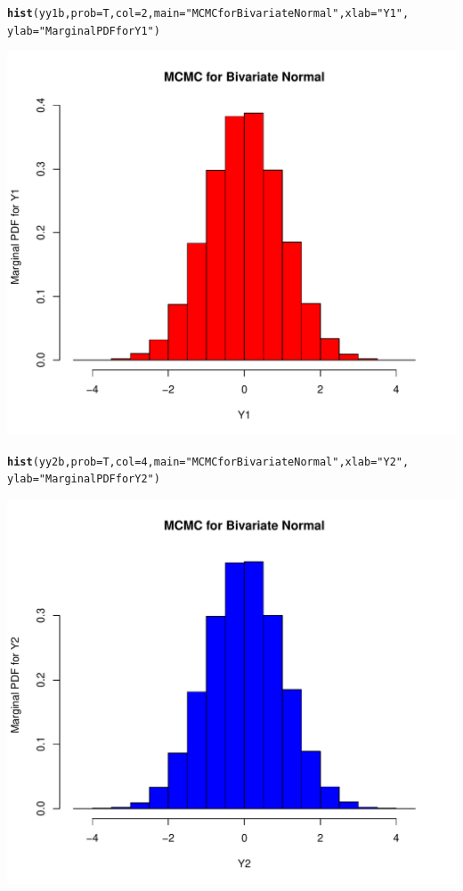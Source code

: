\documentclass[12pt, a4paper, oneside]{article}\usepackage[]{graphicx}\usepackage[]{color}
\makeatletter
\def\maxwidth{ %
  \ifdim\Gin@nat@width>\linewidth
    \linewidth
  \else
    \Gin@nat@width
  \fi
}
\newcommand{\hlstr}[1]{\textcolor[rgb]{0.192,0.494,0.8}{#1}}%
\newcommand{\hlkwd}[1]{\textcolor[rgb]{0.737,0.353,0.396}{\textbf{#1}}}%
\newenvironment{kframe}{%
 \def\at@end@of@kframe{}%
 \ifinner\ifhmode%
  \def\at@end@of@kframe{\end{minipage}}%
  \begin{minipage}{\columnwidth}%
 \fi\fi%
 \def\FrameCommand##1{\hskip\@totalleftmargin \hskip-\fboxsep
 \colorbox{shadecolor}{##1}\hskip-\fboxsep
     \hskip-\linewidth \hskip-\@totalleftmargin \hskip\columnwidth}%
 \MakeFramed {\advance\hsize-\width
   \@totalleftmargin\z@ \linewidth\hsize
   \@setminipage}}%
 {\par\unskip\endMakeFramed%
 \at@end@of@kframe}
\newenvironment{knitrout}{}{} %
\makeatother
\begin{document}
\begin{knitrout}
\color{fgcolor}\begin{kframe}
\begin{alltt}
\hlkwd{hist}(yy1b, prob = T, col = 2, main = \hlstr{"MCMC for Bivariate Normal"}, xlab = \hlstr{"Y1"}, 
    ylab = \hlstr{"Marginal PDF for Y1"})
\end{alltt}
\end{kframe}
\includegraphics[width=\maxwidth]{figure/Hist1} 
\begin{kframe}\begin{alltt}
\hlkwd{hist}(yy2b, prob = T, col = 4, main = \hlstr{"MCMC for Bivariate Normal"}, xlab = \hlstr{"Y2"}, 
    ylab = \hlstr{"Marginal PDF for Y2"})
\end{alltt}
\end{kframe}
\includegraphics[width=\maxwidth]{figure/Hist2} 

\end{knitrout}
\end{document}
